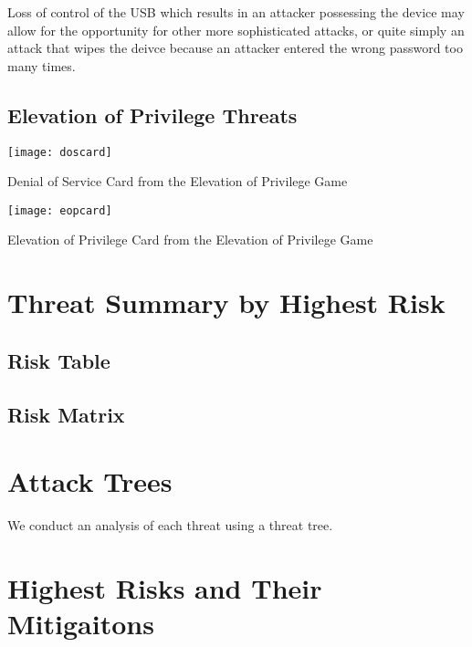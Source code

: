 Loss of control of the USB which results in an attacker possessing the device may allow for the opportunity for other more sophisticated attacks, or quite simply an attack that wipes the deivce because an attacker entered the wrong password too many times.





\subsection{Elevation of Privilege Threats}

\begin{marginfigure}%
\centering
  \texttt{[image: doscard]}
  \caption{Denial of Service Card from the Elevation of Privilege Game}
  \label{fig:doscard}
\end{marginfigure}

\begin{marginfigure}%
\centering
  \texttt{[image: eopcard]}
  \caption{Elevation of Privilege Card from the Elevation of Privilege Game}
  \label{fig:eopcard}
\end{marginfigure}


\section{Threat Summary by Highest Risk}

\subsection{Risk Table}

\subsection{Risk Matrix}

\section{Attack Trees}
We conduct an analysis of each threat using a threat tree.

\section{Highest Risks and Their Mitigaitons}
